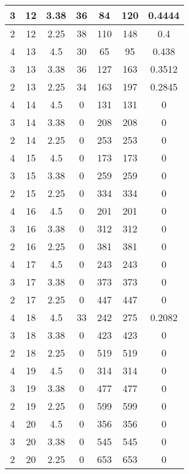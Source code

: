 \documentclass[letterpaper, 12pt]{article}
\begin{document}
\begin{longtable}{|c|c|c|c|c|c|c|}
\hline
3 & 12 & 3.38 & 36 & 84 & 120 & 0.4444 \\
\hline
2 & 12 & 2.25 & 38 & 110 & 148 & 0.4 \\
\hline
4 & 13 & 4.5 & 30 & 65 & 95 & 0.438 \\
\hline
3 & 13 & 3.38 & 36 & 127 & 163 & 0.3512 \\
\hline
2 & 13 & 2.25 & 34 & 163 & 197 & 0.2845 \\
\hline
4 & 14 & 4.5 & 0 & 131 & 131 & 0 \\
\hline
3 & 14 & 3.38 & 0 & 208 & 208 & 0 \\
\hline
2 & 14 & 2.25 & 0 & 253 & 253 & 0 \\
\hline
4 & 15 & 4.5 & 0 & 173 & 173 & 0 \\
\hline
3 & 15 & 3.38 & 0 & 259 & 259 & 0 \\
\hline
2 & 15 & 2.25 & 0 & 334 & 334 & 0 \\
\hline
4 & 16 & 4.5 & 0 & 201 & 201 & 0 \\
\hline
3 & 16 & 3.38 & 0 & 312 & 312 & 0 \\
\hline
2 & 16 & 2.25 & 0 & 381 & 381 & 0 \\
\hline
4 & 17 & 4.5 & 0 & 243 & 243 & 0 \\
\hline
3 & 17 & 3.38 & 0 & 373 & 373 & 0 \\
\hline
2 & 17 & 2.25 & 0 & 447 & 447 & 0 \\
\hline
4 & 18 & 4.5 & 33 & 242 & 275 & 0.2082 \\
\hline
3 & 18 & 3.38 & 0 & 423 & 423 & 0 \\
\hline
2 & 18 & 2.25 & 0 & 519 & 519 & 0 \\
\hline
4 & 19 & 4.5 & 0 & 314 & 314 & 0 \\
\hline
3 & 19 & 3.38 & 0 & 477 & 477 & 0 \\
\hline
2 & 19 & 2.25 & 0 & 599 & 599 & 0 \\
\hline
4 & 20 & 4.5 & 0 & 356 & 356 & 0 \\
\hline
3 & 20 & 3.38 & 0 & 545 & 545 & 0 \\
\hline
2 & 20 & 2.25 & 0 & 653 & 653 & 0 \\
\hline
\end{longtable}
\end{document}
